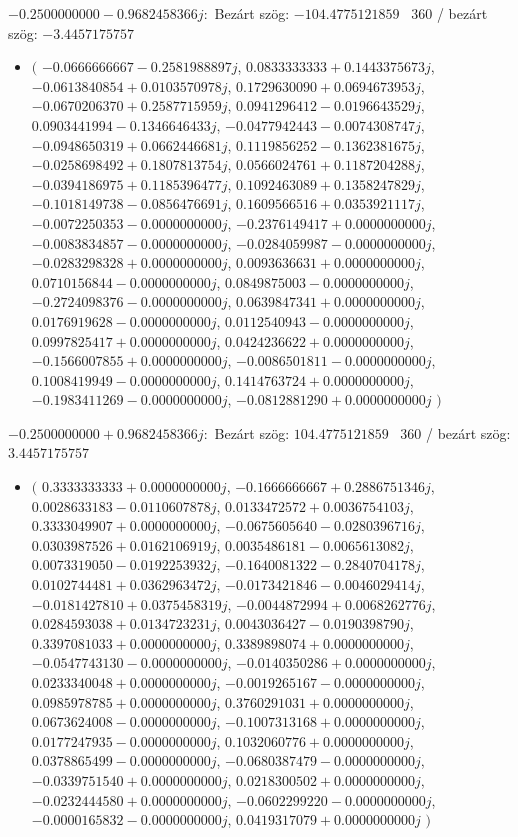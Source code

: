 \documentclass[14pt,a4paper]{article}
\begin{document}
$-0.2500000000-0.9682458366j$:\
Bezárt szög: $-104.4775121859$ \
360 / bezárt szög: $-3.4457175757$\
\begin{itemize}
\item
$\big($
$-0.0666666667-0.2581988897j$, $0.0833333333+0.1443375673j$, $-0.0613840854+0.0103570978j$, $0.1729630090+0.0694673953j$, $-0.0670206370+0.2587715959j$, $0.0941296412-0.0196643529j$, $0.0903441994-0.1346646433j$, $-0.0477942443-0.0074308747j$, $-0.0948650319+0.0662446681j$, $0.1119856252-0.1362381675j$, $-0.0258698492+0.1807813754j$, $0.0566024761+0.1187204288j$, $-0.0394186975+0.1185396477j$, $0.1092463089+0.1358247829j$, $-0.1018149738-0.0856476691j$, $0.1609566516+0.0353921117j$, $-0.0072250353-0.0000000000j$, $-0.2376149417+0.0000000000j$, $-0.0083834857-0.0000000000j$, $-0.0284059987-0.0000000000j$, $-0.0283298328+0.0000000000j$, $0.0093636631+0.0000000000j$, $0.0710156844-0.0000000000j$, $0.0849875003-0.0000000000j$, $-0.2724098376-0.0000000000j$, $0.0639847341+0.0000000000j$, $0.0176919628-0.0000000000j$, $0.0112540943-0.0000000000j$, $0.0997825417+0.0000000000j$, $0.0424236622+0.0000000000j$, $-0.1566007855+0.0000000000j$, $-0.0086501811-0.0000000000j$, $0.1008419949-0.0000000000j$, $0.1414763724+0.0000000000j$, $-0.1983411269-0.0000000000j$, $-0.0812881290+0.0000000000j$
$\big)$
\end{itemize}
$-0.2500000000+0.9682458366j$:\
Bezárt szög: $104.4775121859$ \
360 / bezárt szög: $3.4457175757$\
\begin{itemize}
\item
$\big($
$0.3333333333+0.0000000000j$, $-0.1666666667+0.2886751346j$, $0.0028633183-0.0110607878j$, $0.0133472572+0.0036754103j$, $0.3333049907+0.0000000000j$, $-0.0675605640-0.0280396716j$, $0.0303987526+0.0162106919j$, $0.0035486181-0.0065613082j$, $0.0073319050-0.0192253932j$, $-0.1640081322-0.2840704178j$, $0.0102744481+0.0362963472j$, $-0.0173421846-0.0046029414j$, $-0.0181427810+0.0375458319j$, $-0.0044872994+0.0068262776j$, $0.0284593038+0.0134723231j$, $0.0043036427-0.0190398790j$, $0.3397081033+0.0000000000j$, $0.3389898074+0.0000000000j$, $-0.0547743130-0.0000000000j$, $-0.0140350286+0.0000000000j$, $0.0233340048+0.0000000000j$, $-0.0019265167-0.0000000000j$, $0.0985978785+0.0000000000j$, $0.3760291031+0.0000000000j$, $0.0673624008-0.0000000000j$, $-0.1007313168+0.0000000000j$, $0.0177247935-0.0000000000j$, $0.1032060776+0.0000000000j$, $0.0378865499-0.0000000000j$, $-0.0680387479-0.0000000000j$, $-0.0339751540+0.0000000000j$, $0.0218300502+0.0000000000j$, $-0.0232444580+0.0000000000j$, $-0.0602299220-0.0000000000j$, $-0.0000165832-0.0000000000j$, $0.0419317079+0.0000000000j$
$\big)$
\end{itemize}
\end{document}
